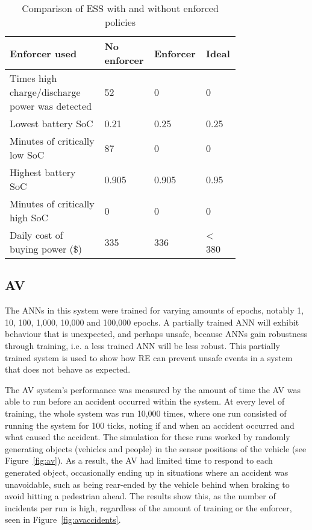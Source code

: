 \begin{table}[H]
	\centering
	\caption{Comparison of ESS with and without enforced policies}
	\label{table:essres}
	\begin{tabular}{|p{0.4\linewidth}|p{0.12\linewidth}|p{0.12\linewidth}|p{0.12\linewidth}|}
		\hline Enforcer used & No enforcer &  Enforcer & Ideal \\ \hline
		Times high charge/discharge power was detected & 52 & 0 & 0 \\ \hline      
		Lowest battery \ac{SoC} & 0.21 & 0.25 & 0.25 \\ \hline
		Minutes of critically low \ac{SoC} & 87 & 0 & 0 \\ \hline
		Highest battery \ac{SoC} & 0.905 & 0.905 & 0.95 \\ \hline
		Minutes of critically high \ac{SoC} & 0 & 0 & 0 \\ \hline
		Daily cost of buying power (\$) & 335 & 336 & < 380 \\ \hline 
	\end{tabular}
\end{table}

\subsection{\acf{AV}}
The \acp{ANN} in this system were trained for varying amounts of epochs, notably 1, 10, 100, 1,000, 10,000 and 100,000 epochs.
A partially trained \ac{ANN} will exhibit behaviour that is unexpected, and perhaps unsafe, because \acp{ANN} gain robustness through training, i.e. a less trained \ac{ANN} will be less robust.
This partially trained system is used to show how \ac{RE} can prevent unsafe events in a system that does not behave as expected.

The \ac{AV} system's performance was measured by the amount of time the \ac{AV} was able to run before an accident occurred within the system.
At every level of training, the whole system was run 10,000 times, where one run consisted of running the system for 100 ticks, noting if and when an accident occurred and what caused the accident. 
The simulation for these runs worked by randomly generating objects (vehicles and people) in the sensor positions of the vehicle (see Figure~\ref{fig:av}).
As a result, the \ac{AV} had limited time to respond to each generated object, occasionally ending up in situations where an accident was unavoidable, such as being rear-ended by the vehicle behind when braking to avoid hitting a pedestrian ahead.
The results show this, as the number of incidents per run is high, regardless of the amount of training or the enforcer, seen in Figure~\ref{fig:avaccidents}.

